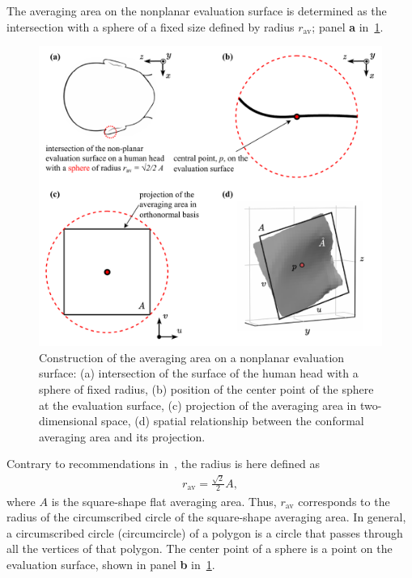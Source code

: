 The averaging area on the nonplanar evaluation surface is determined as the intersection with a sphere of a fixed size defined by radius $r_\text{av}$; panel \textbf{a} in~\cref{fig:evaluation_surface}.
\begin{figure}[t]
    \centering
    \includegraphics[width=\textwidth]{artwork/evaluation_surface.pdf}
    \caption{Construction of the averaging area on a nonplanar evaluation surface: (a) intersection of the surface of the human head with a sphere of fixed radius, (b) position of the center point of the sphere at the evaluation surface, (c) projection of the averaging area in two-dimensional space, (d) spatial relationship between the conformal averaging area and its projection.}
    \label{fig:evaluation_surface}
\end{figure}
Contrary to recommendations in~\cite{IEC63195-2-2022}, the radius is here defined as
\begin{align}
    r_\text{av} = \frac{\sqrt{2}}{2} A,
\end{align}
where $A$ is the square-shape flat averaging area.
Thus, $r_\text{av}$ corresponds to the radius of the circumscribed circle of the square-shape averaging area.
In general, a circumscribed circle (circumcircle) of a polygon is a circle that passes through all the vertices of that polygon.
The center point of a sphere is a point on the evaluation surface, shown in panel \textbf{b} in~\cref{fig:evaluation_surface}.

